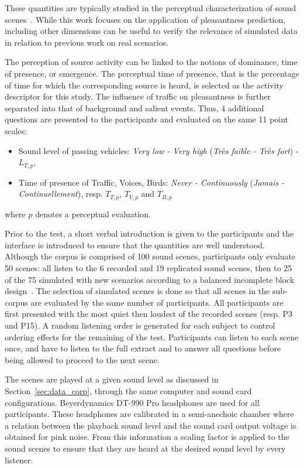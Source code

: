 \documentclass[twocolumn]{article}
\begin{document}
These quantities are typically studied in the perceptual characterization of sound scenes~\cite{axelsson2010, aumond2017, nilsson2007}. While this work focuses on the application of pleasantness prediction, including other dimensions can be useful to verify the relevance of simulated data in relation to previous work on real scenarios.

The perception of source activity can be linked to the notions of dominance, time of presence, or emergence. The perceptual time of presence, that is the percentage of time for which the corresponding source is heard, is selected as the activity descriptor for this study. The influence of traffic on pleasantness is further separated into that of background and salient events. Thus, 4 additional questions are presented to the participants and evaluated on the same 11 point scales:
\begin{itemize}
\item Sound level of passing vehicles: \textit{Very low - Very high} (\textit{Tr\`es faible - Tr\`es fort}) - $L_{T, p}$,
\item Time of presence of Traffic, Voices, Birds: \textit{Never - Continuously} (\textit{Jamais - Continuellement}), resp. $T_{T, p}$, $T_{V, p}$ and $T_{B, p}$
\end{itemize}
where $p$ denotes a perceptual evaluation.

Prior to the test, a short verbal introduction is given to the participants and the interface is introduced to ensure that the quantities are well understood. Although the corpus is comprised of 100 sound scenes, participants only evaluate 50 scenes: all listen to the 6 recorded and 19 replicated sound scenes, then to 25 of the 75 simulated with new scenarios according to a balanced incomplete block design~\cite{dagnelie2003}. The selection of simulated scenes is done so that all scenes in the sub-corpus are evaluated by the same number of participants. All participants are first presented with the most quiet then loudest of the recorded scenes (resp. P3 and P15). A random listening order is generated for each subject to control ordering effects for the remaining of the test. Participants can listen to each scene once, and have to listen to the full extract and to answer all questions before being allowed to proceed to the next scene.

The scenes are played at a given sound level as discussed in Section~\ref{sec:data_corp}, through the same computer and sound card configurations. Beyerdynamics DT-990 Pro headphones are used for all participants. These headphones are calibrated in a semi-anechoic chamber where a relation between the playback sound level and the sound card output voltage is obtained for pink noise. From this information a scaling factor is applied to the sound scenes to ensure that they are heard at the desired sound level by every listener.
\end{document}
